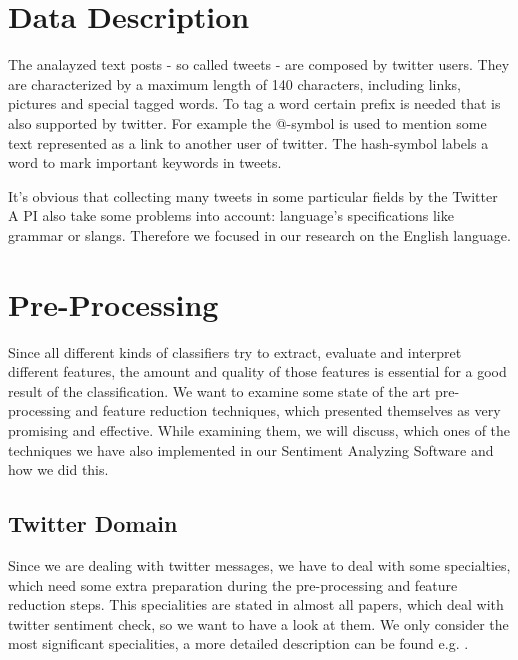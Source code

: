 \documentclass{sig-alternate}
\begin{document}
\section{Data Description}
The analayzed text posts - so called tweets - are composed by twitter users. They are characterized by a maximum length of 140 characters, including links, pictures and special tagged words. To tag a word certain prefix is needed that is also supported by twitter. For example the @-symbol is used to mention some text represented as a link to another user of twitter. The hash-symbol labels a word to mark important keywords in tweets.

It's obvious that collecting many tweets in some particular fields by the Twitter A
PI also take some problems into account: language's specifications like grammar or slangs. Therefore we focused in our research on the English language.

\section{Pre-Processing}
Since all different kinds of classifiers try to extract, evaluate and interpret different features, the amount and quality of those features is essential for a good result of the classification. We want to examine some state of the art pre-processing and feature reduction techniques, which presented themselves as very promising and effective. While examining them, we will discuss, which ones of the techniques we have also implemented in our Sentiment Analyzing Software and how we did this.

\subsection{Twitter Domain}
Since we are dealing with twitter messages, we have to deal with some specialties, which need some extra preparation during the pre-processing and feature reduction steps. This specialities are stated in almost all papers, which deal with twitter sentiment check, so we want to have a look at them. We only consider the most significant specialities, a more detailed description can be found e.g. \cite{Anthony2010Twitter}.
\end{document}
